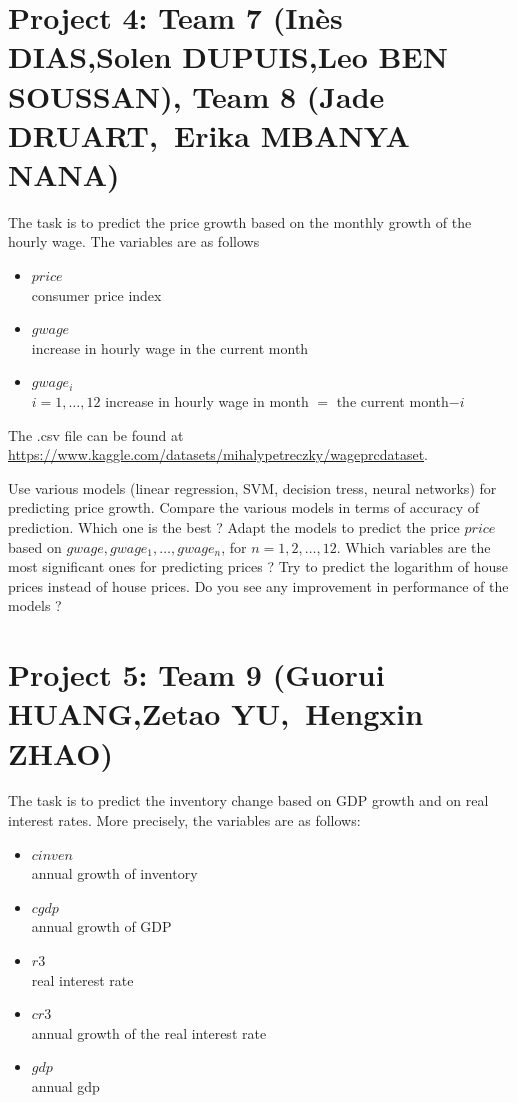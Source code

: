 \documentclass{article}
\begin{document}
   



\section*{Project 4: Team 7 (Inès DIAS,Solen DUPUIS,Leo BEN SOUSSAN), Team 8 (Jade DRUART, Erika MBANYA NANA) }
  The task is to predict the price growth based on the monthly growth of the hourly wage. The variables are as follows
   \begin{itemize}
   \item{$price$ \\}                   consumer price index
   \item{$gwage$ \\}                    increase in hourly wage in the current month
   \item{$gwage_i$ \\} $i=1,\ldots,12$   increase in hourly wage in month $=$ the current month$- i$
  \end{itemize}

   The .csv file can be found at \url{https://www.kaggle.com/datasets/mihalypetreczky/wageprcdataset}. 


    Use various models (linear regression, SVM, decision tress, neural networks) for predicting price growth. Compare the various models in terms of accuracy of prediction. Which one is the best ? 
     Adapt the models to predict the price $price$ based on $gwage,gwage_1,\ldots,gwage_n$, for $n=1,2,\ldots,12$. Which variables are the most
 significant ones for predicting  prices  ?  Try to predict the logarithm of house prices instead of house prices. Do you see any improvement in performance of the models ?

   

 
\section*{Project 5: Team 9 (Guorui HUANG,Zetao YU, Hengxin ZHAO) }
  The task is to predict the inventory change based on GDP growth and on real interest rates. More precisely, the variables are as follows:
  \begin{itemize}
  \item{$cinven$\\}  annual growth of inventory
  \item{$cgdp$\\}    annual growth of GDP %
  \item{$r3$\\}      real interest rate      
  \item{$cr3$\\}     annual growth of the real interest rate      
  \item{$gdp$\\}     annual gdp      
 \end{itemize}
\end{document}

